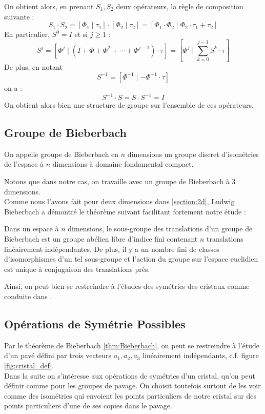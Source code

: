\documentclass{cours}
\begin{document}
On obtient alors, en prenant $S_{1}, S_{2}$ deux opérateurs, la règle de composition suivante :
\begin{equation}\label{eq:product}
    S_{1}\cdot S_{2} = \left[\Phi_{1}\mid \tau_{1}\right]\cdot\left[\Phi_{2}\mid \tau_{2}\right] = \left[\Phi_{1} \cdot \Phi_{2}\mid \Phi_{2}\cdot \tau_{1} + \tau_{2}\right]
\end{equation}
En particulier, $S^{0} = I$ et si $j \geq 1$ :
\begin{equation}\label{eq:power}
    S^{j} = \left[\Phi^{j}\mid \left(I + \Phi + \Phi^{2} + \cdots + \Phi^{j - 1}\right)\cdot \tau\right] = \left[\Phi^{j} \mid \sum_{k = 0}^{j - 1}S^{k} \cdot \tau\right]
\end{equation}
De plus, en notant
\begin{equation}\label{eq:inverse}
    S^{-1} = \left[\Phi^{-1}\mid -\Phi^{-1}\cdot \tau\right]
\end{equation}
on a :
\begin{equation}
    S^{-1} \cdot S = S \cdot S^{-1} = I
\end{equation}
On obtient alors bien une structure de groupe sur l'ensemble de ces opérateurs.
\subsection{Groupe de Bieberbach}
\begin{definition}
    On appelle groupe de Bieberbach en $n$ dimensions un groupe discret d'isométries de l'espace à $n$ dimensions à domaine fondamental compact.
\end{definition}
Notons que dans notre cas, on travaille avec un groupe de Bieberbach à $3$ dimensions. \\
Comme nous l'avons fait pour deux dimensions dans \ref{section:2d}, Ludwig Bieberbach \cite{Bib} a démontré le théorème suivant facilitant fortement notre étude :
\begin{theorem}[de Bieberbach]\label{thm:Bieberbach}
    Dans un espace à $n$ dimensions, le sous-groupe des translations d'un groupe de Bieberbach est un groupe abélien libre d'indice fini contenant $n$ translations linéairement indépendantes. De plus, il y a un nombre fini de classes d'isomorphismes d'un tel sous-groupe et l'action du groupe sur l'espace euclidien est unique à conjugaison des translations près.
\end{theorem}
Ainsi, on peut bien se restreindre à l'études des symétries des cristaux comme conduite dans \cite{Za}.

\subsection{Opérations de Symétrie Possibles}
Par le théorème de Bieberbach \ref{thm:Bieberbach}, on peut se restreindre à l'étude d'un pavé défini par trois vecteurs $a_{1}, a_{2}, a_{3}$ linéairement indépendants, c.f. figure \ref{fig:cristal_def}. \\
Dans la suite on s'intéresse aux opérations de symétries d'un cristal, qu'on peut définir comme pour les groupes de pavage. On choisit toutefois surtout de les voir comme des isométries qui envoient les points particuliers de notre cristal sur des points particuliers d'une de ses copies dans le pavage.
\end{document}
